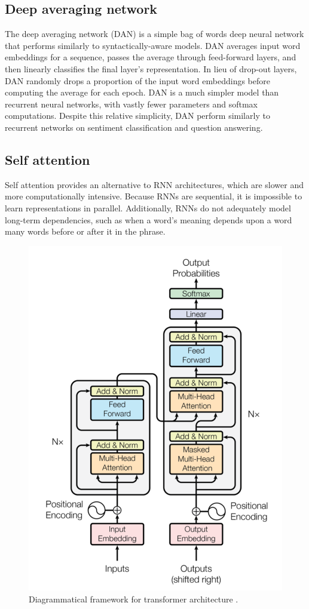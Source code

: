 \subsection{Deep averaging network}

The deep averaging network (DAN) \cite{dan} is a simple bag of words deep neural network that performs similarly to syntactically-aware models. DAN averages input word embeddings for a sequence, passes the average through feed-forward layers, and then linearly classifies the final layer's representation. In lieu of drop-out layers, DAN randomly drops a proportion of the input word embeddings before computing the average for each epoch. DAN is a much simpler model than recurrent neural networks, with vastly fewer parameters and softmax computations. Despite this relative simplicity, DAN perform similarly to recurrent networks on sentiment classification and question answering. 

\subsection{Self attention}

Self attention \cite{attention} provides an alternative to RNN architectures, which are slower and more computationally intensive. Because RNNs are sequential, it is impossible to learn representations in parallel. Additionally, RNNs do not adequately model long-term dependencies, such as when a word's meaning depends upon a word many words before or after it in the phrase. 

\begin{figure}[h!]
\centering
  \includegraphics[width=.5\linewidth]{files/attention-1.png}
  \caption{Diagrammatical framework for transformer architecture \cite{attention}.}
  \label{fig:attention-1}
\end{figure}

